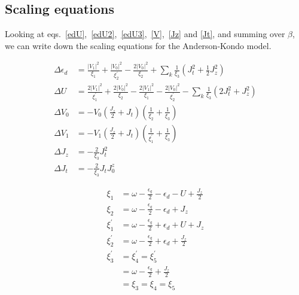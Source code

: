 \documentclass[12pt,twoside]{report}
\numberwithin{equation}{section}
\begin{document}
\subsection{Scaling equations}
Looking at eqs.~\ref{edU},~\ref{edU2},~\ref{edU3},~\ref{V},~\ref{Jz} and \ref{Jt}, and summing over \(\beta\), we can write down the scaling equations for the Anderson-Kondo model.
\pb \begin{minipage}{320pt}
\begin{equation}\begin{aligned}
	\Delta \epsilon_d &= \frac{|V_1|^2}{\xi_1} + \frac{|V_0|^2}{\xi_2^\prime} - \frac{2|V_0|^2}{\xi_2} + \sum_k \frac{1}{\xi_3}\left(J_t^2  + \frac{1}{2}J_z^2\right)\\
	\Delta U &= \frac{2|V_1|^2}{\xi_1^\prime} + \frac{2|V_0|^2}{\xi_2} - \frac{2|V_1|^2}{\xi_1} - \frac{2|V_0|^2}{\xi_2^\prime} - \sum_k \frac{1}{\xi_3}\left(2J_t^2 + J_z^2\right)\\
	\Delta V_0 &= -V_0\left(\frac{J_z}{2} + J_t \right) \left(\frac{1}{\xi_2} + \frac{1}{\xi_3}\right)\\
	\Delta V_1 &= -V_1\left(\frac{J_z}{2} + J_t \right) \left(\frac{1}{\xi^\prime_1} + \frac{1}{\xi_3}\right)\\
	\Delta J_z &= -\frac{2}{\xi_3}J_t^2\\
	\Delta J_t &= -\frac{2}{\xi_3}J_t J^z_0
\end{aligned}\end{equation}
\end{minipage}
\vline
\begin{minipage}{150pt}
\begin{equation*}\begin{aligned}
	\xi_1 &= \omega - \frac{\epsilon_q}{2} - \epsilon_d - U + \frac{J_z}{2}\\
	\xi_2 &= \omega - \frac{\epsilon_q}{2} - \epsilon_d + J_z\\
	\xi_1^\prime &= \omega - \frac{\epsilon_q}{2} + \epsilon_d + U + J_z\\
	\xi_2^\prime &= \omega - \frac{\epsilon_q}{2} + \epsilon_d + \frac{J_z}{2}\\
	\xi_3^\prime &= \xi_4^\prime = \xi_5^\prime \\
		     &= \omega - \frac{\epsilon_q}{2} + \frac{J_z}{2}\\
		     &= \xi_3 = \xi_4 = \xi_5\\
\end{aligned}\end{equation*}
\end{minipage}
\end{document}
